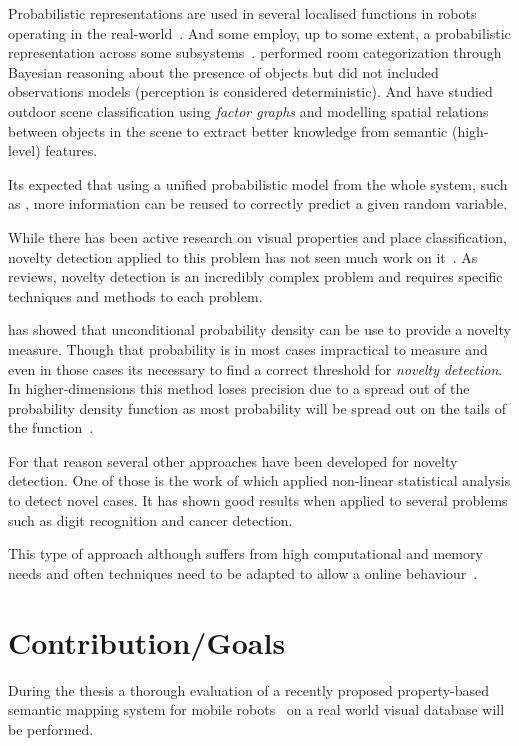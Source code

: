 Probabilistic representations are used in several localised functions in robots operating in the real-world~\citep{gross2009toomas,maierprobabilistic}. And some employ, up to some extent, a probabilistic representation across some subsystems~\citep{kraft2008exploration}.
\citet{vasudevan2008bayesian} performed room categorization through Bayesian reasoning about the presence of objects but did not included observations models (perception is considered deterministic).
And \cite{boutell2006factor} have studied outdoor scene classification using \emph{factor graphs} and modelling spatial relations between objects in the scene to extract better knowledge from semantic (high-level) features.

Its expected that using a unified probabilistic model from the whole system, such as \cite{pronobis2011exploiting}, more information can be reused to correctly predict a given random variable.

While there has been active research on visual properties and place classification, novelty detection applied to this problem has not seen much work on it~\citep{caputo2009overview}.
As \cite{markou2003novelty} reviews, novelty detection is an incredibly complex problem and requires specific techniques and methods to each problem.

\cite{bishop1994novelty} has showed that unconditional probability density can be use to provide a novelty measure. Though that probability is in most cases impractical to measure and even in those cases its necessary to find a correct threshold for \emph{novelty detection}. In higher-dimensions this method loses precision due to a spread out of the probability density function as most probability will be spread out on the tails of the function~\citep{markou2003novelty-part2}.

For that reason several other approaches have been developed for novelty detection.
One of those is the work of \cite{Hoffmann2007863} which applied non-linear statistical analysis to detect novel cases.
It has shown good results when applied to several problems such as digit recognition and cancer detection.

This type of approach although suffers from high computational and memory needs and often techniques need to be adapted to allow a online behaviour~\citep{sofman2010anytime}.


\section{Contribution/Goals}
\label{sec:goals}
During the thesis a thorough evaluation of a recently proposed property-based semantic mapping system for mobile robots~\citep{pronobis2011exploiting} on a real world visual database will be performed.

